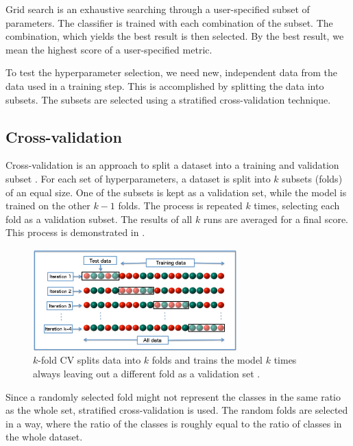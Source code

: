 Grid search is an exhaustive searching through a user-specified subset of parameters. The classifier is trained with each combination of the subset. The combination, which yields the best result is then selected. By the best result, we mean the highest score of a user-specified metric.

To test the hyperparameter selection, we need new, independent data from the data used in a training step. This is accomplished by splitting the data into subsets. The subsets are selected using a stratified cross-validation technique.

\subsection{Cross-validation}
Cross-validation is an approach to split a dataset into a training and validation subset \cite{RodPerLoz10}. For each set of hyperparameters, a dataset is split into $k$ subsets (folds) of an equal size. One of the subsets is kept as a validation set, while the model is trained on the other $k-1$ folds. The process is repeated $k$ times, selecting each fold as a validation subset. The results of all $k$ runs are averaged for a final score. This process is demonstrated in .
\begin{figure}
    \centering
    \includegraphics[width=0.7\textwidth]{Figures/svm/k-fold.jpg}
    \caption[$k$-fold CV splits data into $k$ folds and trains the model $k$ times always leaving out a different fold as a validation set]{$k$-fold CV splits data into $k$ folds and trains the model $k$ times always leaving out a different fold as a validation set \cite{crossval}.}
    \label{fig:k-fold}
\end{figure}

Since a randomly selected fold might not represent the classes in the same ratio as the whole set, stratified cross-validation is used. The random folds are selected in a way, where the ratio of the classes is roughly equal to the ratio of classes in the whole dataset.
